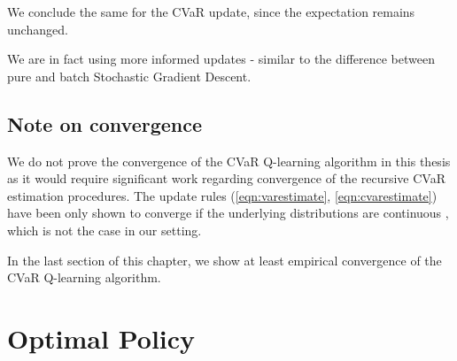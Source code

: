 We conclude the same for the CVaR update, since the expectation remains unchanged. 

We are in fact using more informed updates - similar to the difference between pure and batch Stochastic Gradient Descent.
%
%
%    
%	
%

\subsection{Note on convergence}
We do not prove the convergence of the CVaR Q-learning algorithm in this thesis as it would require significant work regarding convergence of the recursive CVaR estimation procedures. The update rules (\ref{eqn:varestimate}, \ref{eqn:cvarestimate})  have been only shown to converge if the underlying distributions are continuous \citep{bardou2009recursive}, which is not the case in our setting.


In the last section of this chapter, we show at least empirical convergence of the CVaR Q-learning algorithm.



\section{Optimal Policy}\label{sec:qpolicy}

